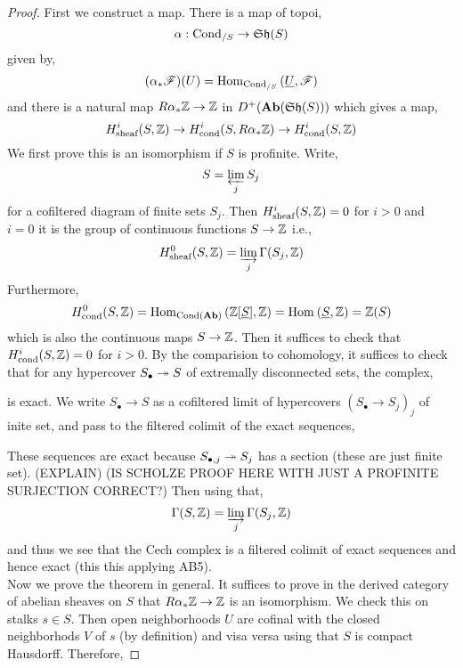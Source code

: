 \documentclass[12pt]{article}
\newcommand{\cond}{\text{cond}}
\newcommand{\sheaf}{\text{sheaf}}
\newcommand{\Cond}{\mathrm{Cond}}
\renewcommand{\Cech}{\text{\v{C}ech}\xspace}
\begin{document}
\begin{proof}
First we construct a map. There is a map of topoi, 
\[ \alpha : \Cond_{/S} \to \Sh(S) \]
given by,
\[ (\alpha_* \F)(U) = \Hom{\Cond_{/S}}{\underline{U}}{\F} \]
and there is a natural map $R \alpha_* \mathbb{Z} \to \mathbb{Z}$ in $D^+(\mathbf{Ab}(\mathfrak{Sh}(S)))$ which gives a map,
\[ H^i_{\sheaf}(S, \Z) \to H^i_{\cond}(S, R \alpha_* \Z) \to H^i_{\cond}(S, \Z) \]
We first prove this is an isomorphism if $S$ is profinite. Write,
\[ S = \operatorname*{\varprojlim}_j S_j \]
for a cofiltered diagram of finite sets $S_j$. Then $H^i_{\sheaf}(S, \Z) = 0$ for $i > 0$ and $i = 0$ it is the group of continuous functions $S \to \mathbb{Z}$ i.e.,
\[ H^0_{\sheaf}(S, \Z) = \dlim_j \Gamma(S_j, \Z) \]
Furthermore,
\[ H^0_{\cond}(S, \Z) = \Hom{\Cond(\Ab)}{\Z[\underline{S}]}{\Z} = \Hom{}{\underline{S}}{\Z} = \Z(S) \]
which is also the continuous maps $S \to \mathbb{Z}$. Then it suffices to check that $H^i_{\cond}(S, \Z) = 0$ for $i > 0$. By the comparision to \Cech cohomology, it suffices to check that for any hypercover $S_\bullet \twoheadrightarrow S$ of extremally disconnected sets, the \Cech complex,
\begin{center}
\end{center}
is exact. We write $S_\bullet \to S$ as a cofiltered limit of hypercovers $(S_\bullet \to S_j)_j$ of inite set, and pass to the filtered colimit of the exact sequences,
\begin{center}
\end{center}
These sequences are exact because $S_{\bullet, j} \twoheadrightarrow S_j$ has a section (these are just finite set). (EXPLAIN) (IS SCHOLZE PROOF HERE WITH JUST A PROFINITE SURJECTION CORRECT?)
Then using that,
\[ \Gamma(S, \mathbb{Z}) = \operatorname*{\varinjlim}_j \Gamma(S_j, \mathbb{Z}) \]
and thus we see that the Cech complex is a filtered colimit of exact sequences and hence exact (this this applying AB5).
\bigskip\\
Now we prove the theorem in general. It suffices to prove in the derived category of abelian sheaves on $S$ that $R \alpha_* \mathbb{Z} \to \mathbb{Z}$ is an isomorphism. We check this on stalks $s \in S$. Then open neighborhoods $U$ are cofinal with the closed neighborhods $V$ of $s$ (by definition) and visa versa using that $S$ is compact Hausdorff. Therefore,

\end{proof}
\end{document}
